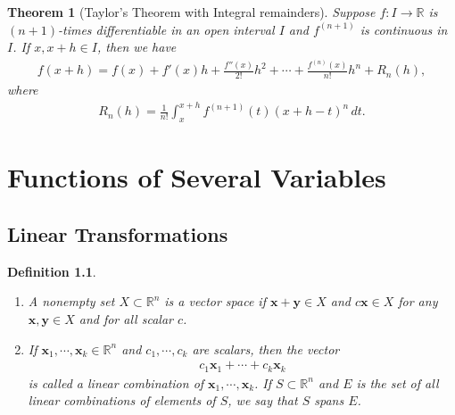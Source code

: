 \documentclass[11pt]{book}
\newtheorem{definition}{Definition}[chapter]
\newtheorem{theorem}{Theorem}[chapter]
\theoremstyle{definition}
\numberwithin{equation}{chapter}
\begin{document}
\medskip

\begin{theorem}[Taylor's Theorem with Integral remainders]\label{th_629}
Suppose $f: I \to \mathbb{R}$ is $(n+1)$-times differentiable in an open interval $I$ and $f^{(n+1)}$ is continuous in $I$. If $x, x+h \in I$, then we have
\begin{align*}
    f(x + h) = f(x) + f'(x)h + \frac{f''(x)}{2!}h^2 + \cdots + \frac{f^{(n)}(x)}{n!}h^n + R_n(h),
\end{align*}
where
\begin{align*}
    R_n(h) = \frac{1}{n!} \int^{x+h}_x f^{(n+1)}(t) (x +  h - t)^n \,dt.
\end{align*}
\end{theorem}






\chapter{Functions of Several Variables}

\section{Linear Transformations}

\begin{definition}
~\begin{enumerate}[label=(\alph*)]
    \item A nonempty set $X \subset \mathbb{R}^n$ is a vector space if $\mathbf{x} + \mathbf{y} \in X$ and $c\mathbf{x} \in X$ for any $\mathbf{x}, \mathbf{y} \in X$ and for all scalar $c$.
    
    \item If $\mathbf{x}_1, \cdots, \mathbf{x}_k \in \mathbb{R}^n$ and $c_1, \cdots, c_k$ are scalars, then the vector 
    \begin{align*}
        c_1 \mathbf{x}_1 + \cdots + c_k \mathbf{x}_k
    \end{align*}
    is called a linear combination of $\mathbf{x}_1, \cdots, \mathbf{x}_k$. If $S \subset \mathbb{R}^n$ and $E$ is the set of all linear combinations of elements of $S$, we say that $S$ spans $E$.
\end{enumerate}
\end{definition}
\end{document}

